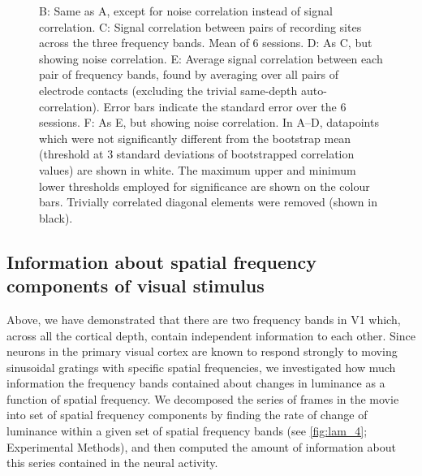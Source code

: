 \begin{figure}
{B: Same as A, except for noise correlation instead of signal correlation.
C: Signal correlation between pairs of recording sites across the three frequency bands.
Mean of 6 sessions.
D: As C, but showing noise correlation.
E: Average signal correlation between each pair of frequency bands, found by averaging over all pairs of electrode contacts (excluding the trivial same-depth auto-correlation).
Error bars indicate the standard error over the 6 sessions.
F: As E, but showing noise correlation.
In A--D, datapoints which were not significantly different from the bootstrap mean (threshold at 3 standard deviations of bootstrapped correlation values) are shown in white.
The maximum upper and minimum lower thresholds employed for significance are shown on the colour bars.
Trivially correlated diagonal elements were removed (shown in black).
}
\label{fig:lam_s3}
%
\end{figure}


\subsection{Information about spatial frequency components of visual stimulus}

Above, we have demonstrated that there are two frequency bands in \ac{V1} which, across all the cortical depth, contain independent information to each other.
Since neurons in the primary visual cortex are known to respond strongly to moving sinusoidal gratings with specific spatial frequencies, we investigated how much information the frequency bands contained about changes in luminance as a function of spatial frequency.
We decomposed the series of frames in the movie into set of spatial frequency components by finding the rate of change of luminance within a given set of spatial frequency bands (see \autoref{fig:lam_4}; Experimental Methods), and then computed the amount of information about this series contained in the neural activity.

